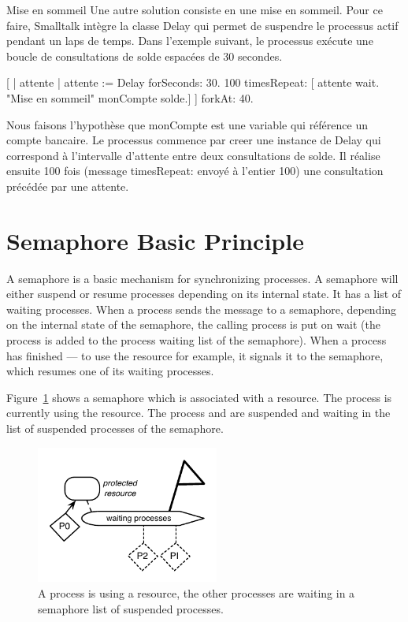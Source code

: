 \documentclass[a4paper,10pt,twoside]{book}
\begin{document}
Mise en sommeil
Une autre solution consiste en une mise en sommeil. Pour ce faire, Smalltalk intègre la classe Delay qui permet de suspendre le processus actif pendant un laps de temps. Dans l'exemple suivant, le processus exécute une boucle de consultations de solde espacées de 30 secondes.

[ | attente |
    attente := Delay forSeconds: 30.
    100 timesRepeat: [
             attente wait.  "Mise en sommeil"
             monCompte solde.]
] forkAt: 40.


Nous faisons l'hypothèse que monCompte est une variable qui référence un compte bancaire. Le processus commence par creer une instance de Delay qui correspond à l'intervalle d'attente entre deux consultations de solde. Il réalise ensuite 100 fois (message timesRepeat: envoyé à l'entier 100) une consultation précédée par une attente.









\section{Semaphore Basic Principle}\label{sec:semaphore}
A semaphore is a basic mechanism for synchronizing processes.  A semaphore will either suspend or resume processes depending on its internal state. It has a list of waiting processes. 
When a process sends the message  to a semaphore, depending on the internal state of the semaphore, the calling process is put on wait (the process is added to the process waiting list of the semaphore). When a process has finished --- to use the resource for example, it signals it to the semaphore, which resumes one of its waiting processes. 

Figure~\ref{fig:sema} shows a semaphore which is associated with a resource. The process  is currently using the resource. The process  and    are suspended and waiting in the list of suspended processes of the semaphore. 

\begin{figure}
\begin{center}
\includegraphics[width=6cm]{ASemaphoreAndProcesses}
\caption{ A process is using a resource, the other processes are waiting in a semaphore list of suspended processes. \label{fig:sema}}
\end{center}
\end{figure}
\end{document}
